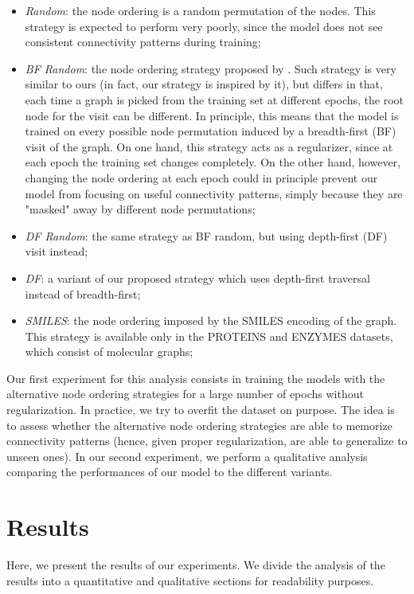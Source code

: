 \begin{itemize}
    \item \emph{Random}: the node ordering is a random permutation of the nodes. This strategy is expected to perform very poorly, since the model does not see consistent connectivity patterns during training;
    \item \emph{BF Random}: the node ordering strategy proposed by \citet{you2018graphrnn}. Such strategy is very similar to ours (in fact, our strategy is inspired by it), but differs in that, each time a graph is picked from the training set at different epochs, the root node for the visit can be different. In principle, this means that the model is trained on every possible node permutation induced by a breadth-first (BF) visit of the graph. On one hand, this strategy acts as a regularizer, since at each epoch the training set changes completely. On the other hand, however, changing the node ordering at each epoch could in principle prevent our model from focusing on useful connectivity patterns, simply because they are "masked" away by different node permutations;
    \item \emph{DF Random}: the same strategy as BF random, but using depth-first (DF) visit instead;
    \item \emph{DF}: a variant of our proposed strategy which uses depth-first traversal instead of breadth-first;
    \item \emph{SMILES}: the node ordering imposed by the SMILES encoding of the graph. This strategy is available only in the PROTEINS and ENZYMES datasets, which consist of molecular graphs;
\end{itemize}
Our first experiment for this analysis consists in training the models with the alternative node ordering strategies for a large number of epochs without regularization. In practice, we try to overfit the dataset on purpose. The idea is to assess whether the alternative node ordering strategies are able to memorize connectivity patterns (hence, given proper regularization, are able to generalize to unseen ones). In our second experiment, we perform a qualitative analysis comparing the performances of our model to the different variants.

\section{Results}
Here, we present the results of our experiments. We divide the analysis of the results into a quantitative and qualitative sections for readability purposes.

